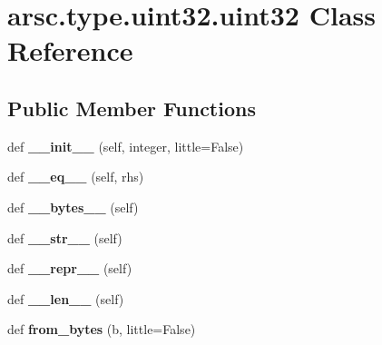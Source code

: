 \hypertarget{classarsc_1_1type_1_1uint32_1_1uint32}{}\section{arsc.\+type.\+uint32.\+uint32 Class Reference}
\label{classarsc_1_1type_1_1uint32_1_1uint32}
\subsection*{Public Member Functions}
\begin{DoxyCompactItemize}
\item 
\mbox{\label{classarsc_1_1type_1_1uint32_1_1uint32_a3bc4f6213a4725aa624bfb1e20a208a0}} 
def {\bfseries \+\_\+\+\_\+init\+\_\+\+\_\+} (self, integer, little=False)
\item 
\mbox{\label{classarsc_1_1type_1_1uint32_1_1uint32_a42b9e1cf231a74d9573595709d72798f}} 
def {\bfseries \+\_\+\+\_\+eq\+\_\+\+\_\+} (self, rhs)
\item 
\mbox{\label{classarsc_1_1type_1_1uint32_1_1uint32_a0793e0e7247b117d14fe73f9fd373833}} 
def {\bfseries \+\_\+\+\_\+bytes\+\_\+\+\_\+} (self)
\item 
\mbox{\label{classarsc_1_1type_1_1uint32_1_1uint32_a1e658eea120542cbce2141095c32c6a1}} 
def {\bfseries \+\_\+\+\_\+str\+\_\+\+\_\+} (self)
\item 
\mbox{\label{classarsc_1_1type_1_1uint32_1_1uint32_a2290cf551ba2e9e4b357338ae8bb9b65}} 
def {\bfseries \+\_\+\+\_\+repr\+\_\+\+\_\+} (self)
\item 
\mbox{\label{classarsc_1_1type_1_1uint32_1_1uint32_a6135e3fb2fe99986907de3155e49794c}} 
def {\bfseries \+\_\+\+\_\+len\+\_\+\+\_\+} (self)
\item 
\mbox{\label{classarsc_1_1type_1_1uint32_1_1uint32_a311a309a287f86b903adc2eb5baadb95}} 
def {\bfseries from\+\_\+bytes} (b, little=False)
\end{DoxyCompactItemize}
